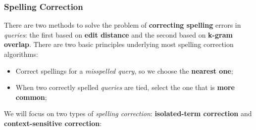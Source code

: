 \documentclass{article}
\begin{document}
\subsubsection{Spelling Correction}
There are two methods to solve the problem of \textbf{correcting spelling} errors in \emph{queries}: the first based on \textbf{edit distance} and the second based on\textbf{ k-gram overlap}. There are two basic principles underlying most spelling correction algorithms:
\begin{itemize}
\item Correct spellings for a \emph{misspelled query}, so we choose the \textbf{nearest one}; 
\item When two correctly spelled \emph{queries} are tied, select the one that is \textbf{more common};
\end{itemize}
We will focus on two types of \emph{spelling correction}: \textbf{isolated-term correction} and \textbf{context-sensitive correction}:
\end{document}
